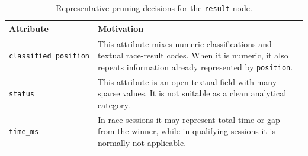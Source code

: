 \documentclass[11pt,a4paper]{article}
\begin{document}
	\begin{table}[H]
		\centering
		\small
		\caption{Representative pruning decisions for the \texttt{result} node.}
		\label{tab:result-pruning-representative}
		\renewcommand{\arraystretch}{1.15}
		\begin{tabularx}{\linewidth}{
				>{\raggedright\arraybackslash}p{4.2cm}
				>{\raggedright\arraybackslash}X
			}
			\toprule
			\textbf{Attribute}
			& \textbf{Motivation} \\
			\midrule
			
			\texttt{classified\_position}
			& This attribute mixes numeric classifications and textual race-result codes. When it is numeric, it also repeats information already represented by \texttt{position}. \\
			
			\midrule
			
			\texttt{status}
			& This attribute is an open textual field with many sparse values. It is not suitable as a clean analytical category. \\
			
			\midrule
			
			\texttt{time\_ms}
			& In race sessions it may represent total time or gap from the winner, while in qualifying sessions it is normally not applicable. \\
			
			\bottomrule
		\end{tabularx}
	\end{table}
	
\end{document}
